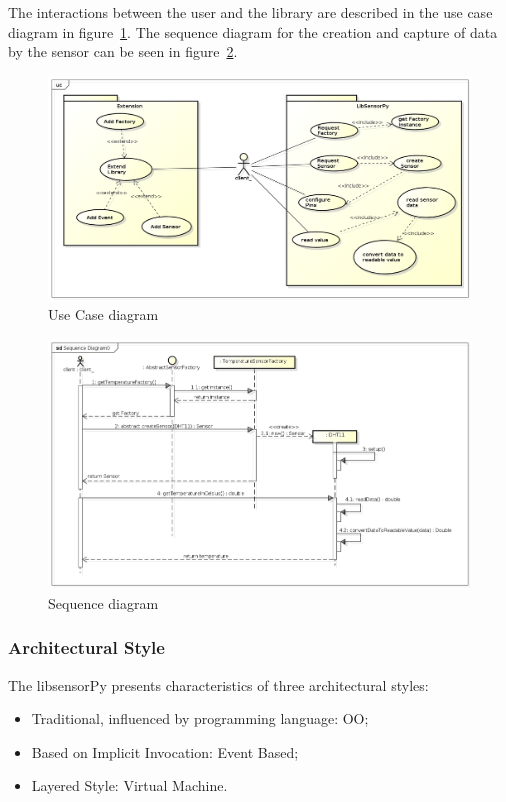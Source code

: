 \documentclass{acm_proc_article-sp}
\begin{document}
The interactions between the user and the library are described in the use case diagram  in figure~\ref{fig:useCase}. The sequence diagram for the creation and capture of data by the sensor can be seen in figure~\ref{fig:sequence}.
\begin{figure}[ht]
\centering
    \includegraphics[width=1.0\textwidth,natwidth=610,natheight=642]{pictures/UseCaseDiagram.png}
    \caption{Use Case diagram}
    \label{fig:useCase}
\end{figure}

\begin{figure}[t]
\centering
    \includegraphics[resolution=300,width=1.0\textwidth,natwidth=610,natheight=642]{pictures/SequenceDiagram3.png}
    \caption{Sequence diagram}
    \label{fig:sequence}
\end{figure}

\subsubsection{Architectural Style}
The libsensorPy presents characteristics of three architectural styles: 
\begin{itemize}
\item Traditional, influenced by programming language: OO;
\item Based on Implicit Invocation: Event Based; 
\item Layered Style: Virtual Machine.
\end{itemize}
\end{document}
